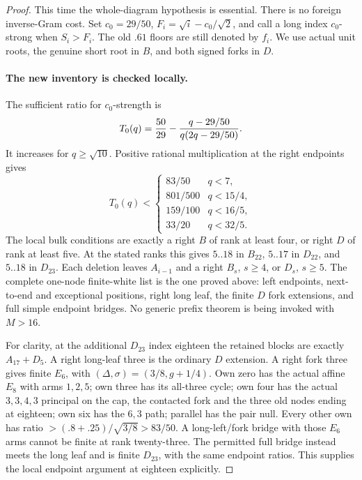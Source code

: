 \documentclass[11pt]{article}
\theoremstyle{definition}
\theoremstyle{remark}
\begin{document}
\begin{proof}
This time the whole-diagram hypothesis is essential. There is no
foreign inverse-Gram cost. Set $c_0=29/50$, $F_i=\sqrt i-c_0/\sqrt2$,
and call a long index $c_0$-strong when $S_i>F_i$. The old $.61$
floors are still denoted by $f_i$. We use actual unit roots, the
genuine short root in $B$, and both signed forks in $D$.

\paragraph{The new inventory is checked locally.}
The sufficient ratio for $c_0$-strength is
\[
 T_0(q)={50\over29}-{q-29/50\over q(2q-29/50)}.
\]
It increases for $q\ge\sqrt{10}$. Positive rational multiplication
at the right endpoints gives
\[
 T_0(q)<\begin{cases}
 83/50&q<7,\\801/500&q<15/4,\\159/100&q<16/5,\\33/20&q<32/5.
 \end{cases}
\]
The local bulk conditions are exactly a right $B$ of rank at least
four, or right $D$ of rank at least five. At the stated ranks this
gives $5..18$ in $B_{22}$, $5..17$ in
$D_{22}$, and $5..18$ in $D_{23}$. Each deletion leaves $A_{i-1}$
and a right $B_s$, $s\ge4$, or $D_s$, $s\ge5$. The complete
one-node finite-white list is the one proved above: left endpoints,
next-to-end and exceptional positions, right long leaf, the finite
$D$ fork extensions, and full simple endpoint bridges. No generic
prefix theorem is being invoked with $M>16$.

For clarity, at the additional $D_{23}$ index eighteen the retained
blocks are exactly $A_{17}+D_5$. A right long-leaf three is the
ordinary $D$ extension. A right fork three gives finite $E_6$,
with $(\Delta,\sigma)=(3/8,g+1/4)$. Own zero has the actual
affine $E_8$ with arms $1,2,5$; own three has its all-three cycle;
own four has the actual $3,3,4,3$ principal on the cap, the
contacted fork and the three old nodes ending at eighteen;
own six has the $6,3$ path; parallel has the pair null.
Every other own has ratio $>(.8+.25)/\sqrt{3/8}>83/50$.
A long-left/fork bridge with those $E_6$ arms cannot be finite at
rank twenty-three. The permitted full bridge instead meets the
long leaf and is finite $D_{23}$, with the same endpoint ratios.
This supplies the local endpoint argument at eighteen explicitly.


\end{proof}
\end{document}
